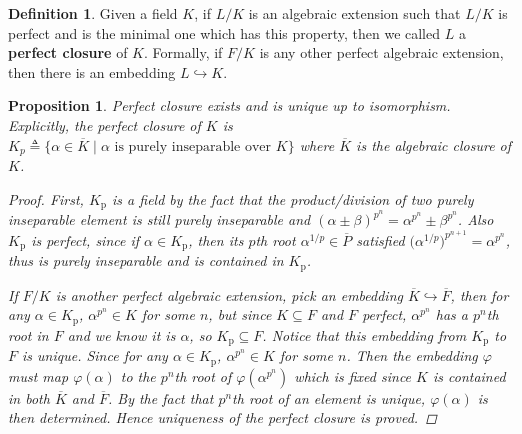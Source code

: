 \documentclass[a4paper]{article}
\newcommand{\defeq}{\triangleq}
\theoremstyle{mystyle}
\newtheorem{proposition}{Proposition}
\theoremstyle{remark}
\theoremstyle{definition}
\theoremstyle{definition}
\newtheorem{definition}{Definition}
\begin{document}
  \begin{definition}
    Given a field $K$, if $L/K$ is an algebraic extension such that $L/K$ is perfect
    and is the minimal one which has this property, then we called $L$ a {\bf perfect closure} of $K$.
    Formally, if $F/K$ is any other perfect algebraic extension, then there is an embedding $L \hookrightarrow K$.
  \end{definition}

  \begin{proposition} \label{prop:perfect-closure-exists}
    Perfect closure exists and is unique up to isomorphism. Explicitly, the perfect closure of $K$ is
    $K_p \defeq \{ \alpha \in \overline{K} \mid \alpha \text{ is purely inseparable over } K \}$
    where $\overline{K}$ is the algebraic closure of $K$.

    \begin{proof}
      First, $K_\text{p}$ is a field by the fact that the product/division of two purely inseparable element
      is still purely inseparable and $(\alpha \pm \beta)^{p^n} = \alpha^{p^n} \pm \beta^{p^n}$.
      Also $K_\text{p}$ is perfect, since if $\alpha \in K_\text{p}$,
      then its $p$th root $\alpha^{1/p} \in \overline{P}$ satisfied $\big(\alpha^{1/p}\big)^{p^{n+1}} =
      \alpha^{p^n}$, thus is purely inseparable and is contained in $K_\text{p}$.

      If $F/K$ is another perfect algebraic extension, pick an embedding
      $\overline{K} \hookrightarrow \overline{F}$, then for any $\alpha \in K_\text{p}$,
      $\alpha^{p^n} \in K$ for some $n$, but since $K \subseteq F$ and $F$ perfect, $\alpha^{p^n}$
      has a $p^n$th root in $F$ and we know it is $\alpha$, so $K_\text{p} \subseteq F$.
      Notice that this embedding from $K_\text{p}$ to $F$ is unique. Since
      for any $\alpha \in K_\text{p}$, $\alpha^{p^n} \in K$ for some $n$.
      Then the embedding $\varphi$ must map $\varphi(\alpha)$ to the $p^n$th root of $\varphi(\alpha^{p^n})$
      which is fixed since $K$ is contained in both $\overline{K}$ and $\overline{F}$.
      By the fact that $p^n$th root of an element is unique, $\varphi(\alpha)$ is then determined.
      Hence uniqueness of the perfect closure is proved.
    \end{proof}
  \end{proposition}
\end{document}
